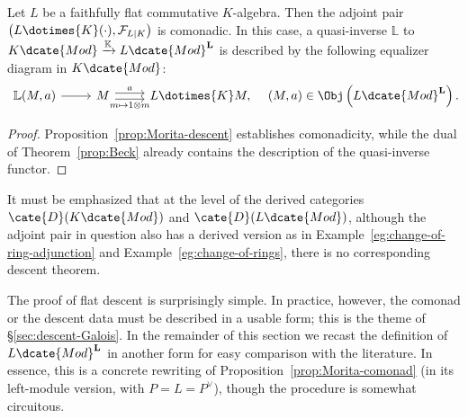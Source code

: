 \begin{theorem}\label{prop:flat-descent}
	Let $L$ be a faithfully flat commutative $K$-algebra. Then the adjoint pair
	$\left(L\dotimes{K}(\mathord\cdot),\mathcal{F}_{L|K}\right)$ is
	comonadic. In this case, a quasi-inverse $\mathbb{L}$ to
	$K\dcate{Mod}\xrightarrow{\mathbb{K}}L\dcate{Mod}^{\mathbf{L}}$ is
	described by the following equalizer diagram in $K\dcate{Mod}$:
	\[\begin{tikzcd}[row sep=tiny]
		\mathbb{L}(M, a) \arrow[r] & M \arrow[shift left, r, "a"] \arrow[shift right, r, "{m \mapsto 1 \otimes m}"'] & L \dotimes{K} M ,
	\end{tikzcd} \quad (M, a) \in \Obj\left(L\dcate{Mod}^{\mathbf{L}}\right). \]
\end{theorem}
\begin{proof}
	Proposition~\ref{prop:Morita-descent} establishes comonadicity, while the
	dual of Theorem~\ref{prop:Beck} already contains the description of the
	quasi-inverse functor.
\end{proof}

\begin{remark}
	It must be emphasized that at the level of the derived categories
	$\cate{D}(K\dcate{Mod})$ and $\cate{D}(L\dcate{Mod})$, although the
	adjoint pair in question also has a derived version as in
	Example~\ref{eg:change-of-ring-adjunction} and
	Example~\ref{eg:change-of-rings}, there is no corresponding descent
	theorem.
\end{remark}

The proof of flat descent is surprisingly simple. In practice, however, the
comonad or the descent data must be described in a usable form; this is the
theme of \S\ref{sec:descent-Galois}. In the remainder of this section we
recast the definition of $L\dcate{Mod}^{\mathbf{L}}$ in another form for
easy comparison with the literature. In essence, this is a concrete
rewriting of Proposition~\ref{prop:Morita-comonad} (in its left-module
version, with $P=L=P^\vee$), though the procedure is somewhat circuitous.

